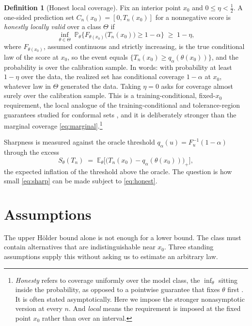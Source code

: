 \documentclass[11pt]{article}
\theoremstyle{definition}
\newtheorem{definition}[theorem]{Definition}
\theoremstyle{remark}
\newcommand{\E}{\mathbb{E}}
\newcommand{\Prob}{\mathbb{P}}
\begin{document}
\begin{definition}[Honest local coverage]\label{def:honest}
Fix an interior point $x_0$ and $0 \le \eta < \tfrac12$. A one-sided prediction set
$C_n(x_0) = [0, T_n(x_0)]$ for a nonnegative score is \emph{honestly locally valid} over a
class $\Theta$ if
\begin{equation}\label{eq:honest}
  \inf_{\theta \in \Theta}\;
  \Prob_{\theta}\!\Big\{ F_{\theta(x_0)}\big(T_n(x_0)\big) \ge 1-\alpha \Big\}
  \;\ge\; 1-\eta ,
\end{equation}
where $F_{\theta(x_0)}$, assumed continuous and strictly increasing, is the true
conditional law of the score at $x_0$, so the event equals
$\{T_n(x_0)\ge q_\alpha(\theta(x_0))\}$, and the probability is over the calibration
sample. In words: with probability at least $1-\eta$
over the data, the realized set has conditional coverage $1-\alpha$ at $x_0$, whatever
law in $\Theta$ generated the data. Taking $\eta=0$ asks for coverage almost surely over
the calibration sample. This is a training-conditional, fixed-$x_0$ requirement, the local
analogue of the training-conditional and tolerance-region guarantees studied for conformal
sets \citep{vovk2012conditional}, and it is deliberately stronger than the marginal coverage
\eqref{eq:marginal}.\footnote{\emph{Honesty} refers to coverage uniformly over the model
class, the $\inf_\theta$ sitting inside the probability, as opposed to a pointwise guarantee
that fixes $\theta$ first \citep{li1989honest,low1997nonparametric,cai2004adaptation}. It is
often stated asymptotically. Here we impose the stronger nonasymptotic version at every $n$.
And \emph{local} means the requirement is imposed at the fixed point $x_0$ rather than over
an interval.}
\end{definition}

Sharpness is measured against the oracle threshold $q_\alpha(u) = F_u^{-1}(1-\alpha)$
through the excess
\begin{equation}\label{eq:sharp}
  S_\theta(T_n) \;=\; \E_\theta\Big[\big(T_n(x_0) - q_\alpha(\theta(x_0))\big)_{+}\Big] ,
\end{equation}
the expected inflation of the threshold above the oracle. The question is how small
\eqref{eq:sharp} can be made subject to \eqref{eq:honest}.

\section{Assumptions}

The upper H\"older bound alone is not enough for a lower bound. The class must contain
alternatives that are indistinguishable near $x_0$. Three standing assumptions supply this
without asking us to estimate an arbitrary law.
\end{document}
